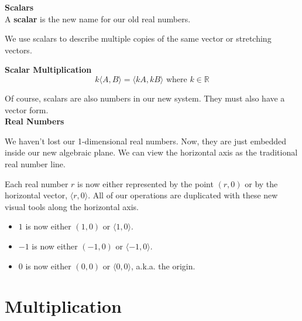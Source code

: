 \documentclass{ximera}
\begin{document}
\begin{definition}  \textbf{\textcolor{green!50!black}{Scalars}}  \\

A \textbf{scalar} is the new name for our old real numbers. 

\end{definition}


We use scalars to describe multiple copies of the same vector or stretching vectors.


\begin{definition}  \textbf{\textcolor{green!50!black}{Scalar Multiplication}}  \\

\[    k \langle A, B \rangle  = \langle k A, k B \rangle   \text{ where }  k \in \mathbb{R}   \]

\end{definition}

Of course, scalars are also numbers in our new system.  They must also have a vector form. \\




\textbf{Real Numbers}



We haven't lost our 1-dimensional real numbers. Now, they are just embedded inside our new algebraic plane.  We can view the horizontal axis as the traditional real number line.

Each real number $r$ is now either represented by the point $(r,0)$ or by the horizontal vector, $\langle r, 0 \rangle$.  All of our operations are duplicated with these new visual tools along the horizontal axis.


\begin{itemize}
\item $1$ is now either $(1,0)$ or $\langle 1, 0 \rangle$.
\item $-1$ is now either $(-1,0)$ or $\langle -1, 0 \rangle$.
\item $0$ is now either $(0,0)$ or $\langle 0, 0 \rangle$, a.k.a. the origin.
\end{itemize}














\section{Multiplication}
\end{document}
